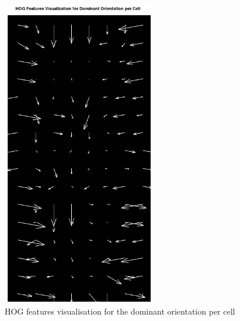 \documentclass[a4paper]{article}
\begin{document}
\begin{minipage}{0.49\textwidth}
\begin{figure}[H]
    \centering
    \includegraphics[width=0.6\textwidth]{./images/2_1_hog_features.png}
    \caption{HOG features visualisation for the dominant orientation per cell}
\end{figure}
\end{minipage}
\end{document}
